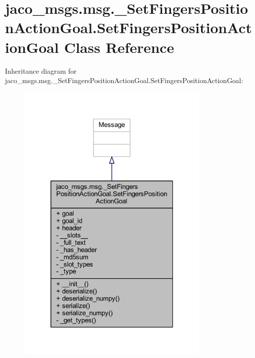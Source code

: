 \hypertarget{classjaco__msgs_1_1msg_1_1__SetFingersPositionActionGoal_1_1SetFingersPositionActionGoal}{}\section{jaco\+\_\+msgs.\+msg.\+\_\+\+Set\+Fingers\+Position\+Action\+Goal.\+Set\+Fingers\+Position\+Action\+Goal Class Reference}
\label{classjaco__msgs_1_1msg_1_1__SetFingersPositionActionGoal_1_1SetFingersPositionActionGoal}


Inheritance diagram for jaco\+\_\+msgs.\+msg.\+\_\+\+Set\+Fingers\+Position\+Action\+Goal.\+Set\+Fingers\+Position\+Action\+Goal\+:
\nopagebreak
\begin{figure}[H]
\begin{center}
\leavevmode
\includegraphics[width=265pt]{d1/d3b/classjaco__msgs_1_1msg_1_1__SetFingersPositionActionGoal_1_1SetFingersPositionActionGoal__inherit__graph}
\end{center}
\end{figure}


